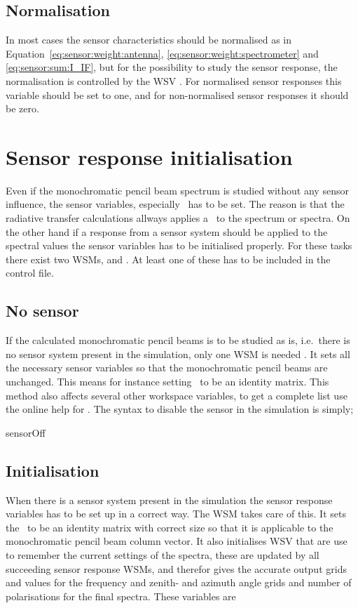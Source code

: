 \subsection{Normalisation}
In most cases the sensor characteristics should be normalised as in
Equation~\ref{eq:sensor:weight:antenna},
\ref{eq:sensor:weight:spectrometer} and \ref{eq:sensor:sum:I_IF}, but
for the possibility to study the sensor response, the normalisation is
controlled by the WSV . For normalised sensor
responses this variable should be set to one, and for non-normalised
sensor responses it should be zero.

\section{Sensor response initialisation}
Even if the monochromatic pencil beam spectrum is studied without any
sensor influence, the sensor variables, especially \SnsMtr\ has to be
set. The reason is that the radiative transfer calculations allways
applies a \SnsMtr\ to the spectrum or spectra. On the other hand if a
response from a sensor system should be applied to the spectral values
the sensor variables has to be initialised properly. For these tasks
there exist two WSMs,  and
. At least one of these has to be
included in the control file.

\subsection{No sensor}
If the calculated monochromatic pencil beams is to be studied as is,
i.e.~there is no sensor system present in the simulation, only one WSM
is needed . It sets all the necessary sensor
variables so that the monochromatic pencil beams are unchanged. This
means for instance setting \SnsMtr\ to be an identity matrix. This
method also affects several other workspace variables, to get a
complete list use the online help for . The
syntax to disable the sensor in the simulation is simply;
\begin{code}
sensorOff{}
\end{code}

\subsection{Initialisation}
When there is a sensor system present in the simulation the sensor
response variables has to be set up in a correct way. The WSM
 takes care of this. It sets the
\SnsMtr\ to be an identity matrix with correct size so that it is
applicable to the monochromatic pencil beam column vector. It also
initialises WSV that are use to remember the current settings of the
spectra, these are updated by all succeeding sensor response WSMs, and
therefor gives the accurate output grids and values for the frequency
and zenith- and azimuth angle grids and number of polarisations for
the final spectra. These variables are

